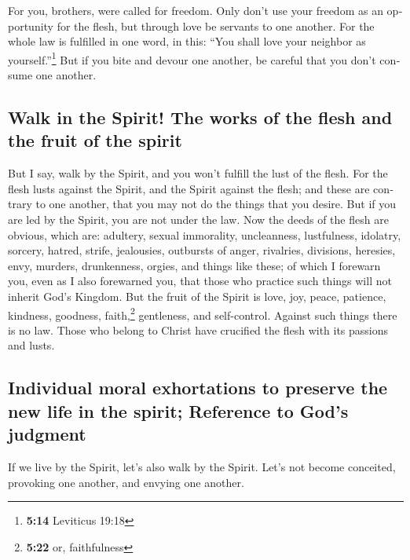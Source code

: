 \begin{paracol}{2}
\begin{otherlanguage}{english}
 For you, brothers, were called for freedom. Only don't
use your freedom as an opportunity for the flesh, but through love be
servants to one another.  For the whole law is fulfilled
in one word, in this: ``You shall love your neighbor as
yourself.''\footnote{\textbf{5:14} Leviticus 19:18}  But
if you bite and devour one another, be careful that you don't consume
one another.

\hypertarget{walk-in-the-spirit-the-works-of-the-flesh-and-the-fruit-of-the-spirit}{%
\subsection{Walk in the Spirit! The works of the flesh and the fruit of
the
spirit}\label{walk-in-the-spirit-the-works-of-the-flesh-and-the-fruit-of-the-spirit}}

 But I say, walk by the Spirit, and you won't fulfill the
lust of the flesh.  For the flesh lusts against the
Spirit, and the Spirit against the flesh; and these are contrary to one
another, that you may not do the things that you desire. 
But if you are led by the Spirit, you are not under the law.
 Now the deeds of the flesh are obvious, which are:
adultery, sexual immorality, uncleanness, lustfulness, 
idolatry, sorcery, hatred, strife, jealousies, outbursts of anger,
rivalries, divisions, heresies,  envy, murders,
drunkenness, orgies, and things like these; of which I forewarn you,
even as I also forewarned you, that those who practice such things will
not inherit God's Kingdom.  But the fruit of the Spirit
is love, joy, peace, patience, kindness, goodness, faith,\footnote{\textbf{5:22}
  or, faithfulness}  gentleness, and self-control.
Against such things there is no law.  Those who belong to
Christ have crucified the flesh with its passions and lusts.

\hypertarget{individual-moral-exhortations-to-preserve-the-new-life-in-the-spirit-reference-to-gods-judgment}{%
\subsection{Individual moral exhortations to preserve the new life in
the spirit; Reference to God's
judgment}\label{individual-moral-exhortations-to-preserve-the-new-life-in-the-spirit-reference-to-gods-judgment}}

 If we live by the Spirit, let's also walk by the Spirit.
 Let's not become conceited, provoking one another, and
envying one another.


\end{otherlanguage}
\end{paracol}
